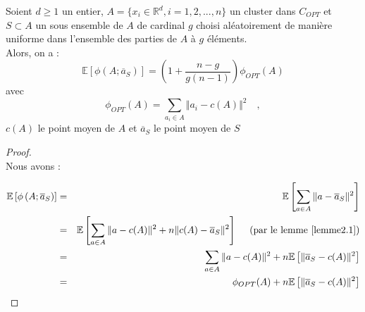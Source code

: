 \documentclass[12pt,a4paper]{book}
\newcommand{\R}{\mathbb{R}}
\newcommand{\E}{\mathbb{E}}
\newcommand{\1}{\mathds{1}}
\begin{document}
	\begin{env_lemme}\label{lemme4.1}
		Soient $d \geq 1$ un entier, $A = \{ x_i \in \R^d, i=1,2, ..., n \}$ un cluster dans $C_{OPT}$ et $S \subset A$ un sous ensemble de $A$ de cardinal $g$ choisi aléatoirement de manière uniforme dans l'ensemble des parties de $A$ à $g$ éléments.\\
		Alors, on a :
		$$
			\E \left[ \phi\left(A;\overline{a}_S \right) \right] = \left(1 + \frac{n-g}{g(n-1)} \right) \phi_{OPT}(A)
		$$		
		avec 
		$$
			\phi_{OPT}(A) = \sum_{a_i \in A} \Vert a_i - c(A) \Vert^2 \quad ,
		$$
		$c(A)$ le point moyen de $A$ et $\overline{a}_S$ le point moyen de $S$
	\end{env_lemme}	
	
	\begin{proof}
		~\\
		Nous avons :
		
		\begin{eqnarray*}
			\E \left[ \phi\left(A;\overline{a}_S \right) \right] &=& \E \left[ \sum_{a \in A} \Vert a - \overline{a}_S \Vert^2 \right] \\
			&=& \E \left[ \sum_{a \in A} \Vert a - c(A) \Vert^2 + n \Vert c(A) - \overline{a}_S \Vert^2 \right] \quad \textrm{ (par le lemme \ref{lemme2.1})} \\
			&=& \sum_{a \in A} \Vert a - c(A) \Vert^2 + n \E \left[ \Vert \overline{a}_S - c(A) \Vert^2 \right] \\
			&=& \phi_{OPT}(A) + n \E \left[ \Vert \overline{a}_S - c(A) \Vert^2 \right]
		\end{eqnarray*}
		

\end{proof}
\end{document}
